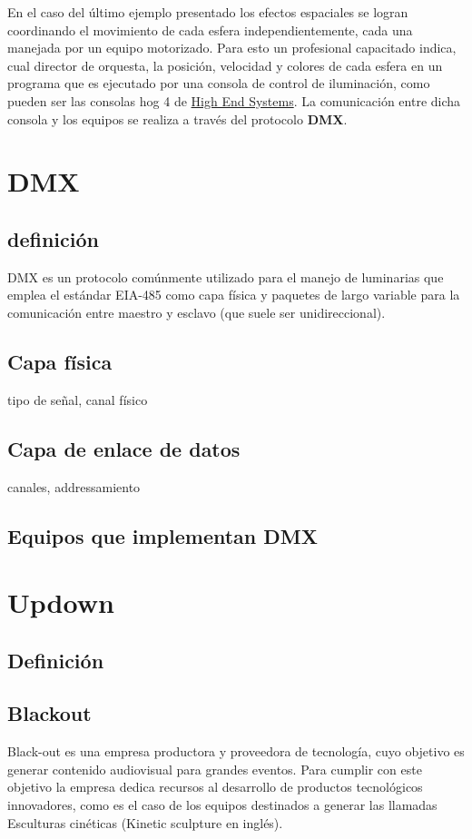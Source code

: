 \newpage
En el caso del último ejemplo presentado los efectos espaciales se logran coordinando el movimiento de cada esfera independientemente, cada una manejada por un equipo motorizado. Para esto un profesional capacitado indica, cual director de orquesta, la posición, velocidad y colores de cada esfera en un programa que es ejecutado por una consola de control de iluminación, como pueden ser las consolas hog 4 de \href{https://www.highend.com/}{High End Systems}. La comunicación entre dicha consola y los equipos se realiza a través del protocolo \textbf{DMX}.

\section{DMX}
\subsection{definición}
DMX es un protocolo comúnmente utilizado para el manejo de luminarias que emplea el estándar EIA-485 como capa física y paquetes de largo variable para la comunicación entre maestro y esclavo (que suele ser unidireccional).
\subsection{Capa física}
tipo de señal, canal físico

\subsection{Capa de enlace de datos}
canales, addressamiento
\subsection{Equipos que implementan DMX}


\section{Updown}
\subsection{Definición}


\subsection{Blackout}
Black-out es una empresa productora y proveedora de tecnología, cuyo objetivo es generar contenido audiovisual para grandes eventos. Para cumplir con este objetivo la empresa dedica recursos al desarrollo de productos tecnológicos innovadores, como es el caso de los equipos destinados a generar las llamadas Esculturas cinéticas (Kinetic sculpture en inglés).\\


